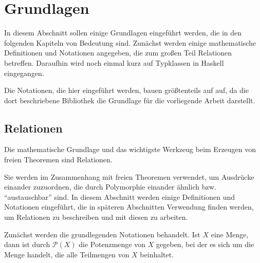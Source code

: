 \section{Grundlagen}

In diesem Abschnitt sollen einige Grundlagen eingeführt werden, die in den folgenden Kapiteln von Bedeutung sind. Zunächst werden
einige mathematische Definitionen und Notationen angegeben, die zum großen Teil Relationen betreffen.
Daraufhin wird noch einmal kurz auf Typklassen in Haskell eingegangen.

Die Notationen, die hier eingeführt werden, bauen größtenteils auf \cite{freetheorems} auf, da die dort beschriebene Bibliothek
die Grundlage für die vorliegende Arbeit darstellt.


\subsection{Relationen}

Die mathematische Grundlage und das wichtigste Werkzeug beim Erzeugen von freien Theoremen sind Relationen.

Sie werden im Zusammenhang mit freien Theoremen verwendet, um Ausdrücke einander zuzuordnen, die durch Polymorphie einander
ähnlich bzw. ``austauschbar'' sind.
In diesem Abschnitt werden einige Definitionen und Notationen eingeführt, die in späteren Abschnitten Verwendung finden werden,
um Relationen zu beschreiben und mit diesen zu arbeiten. 


Zunächst werden die grundlegenden Notationen behandelt. Ist $X$ eine Menge, dann ist durch $\mathcal{P}(X)$ die Potenzmenge von $X$ gegeben, bei der es sich um die Menge handelt, die alle Teilmengen von $X$ beinhaltet.


